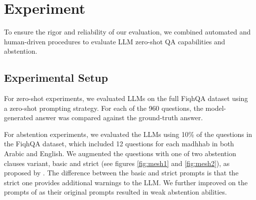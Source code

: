 \documentclass[letterpaper]{article}
\begin{document}
\section{Experiment}
To ensure the rigor and reliability of our evaluation, we combined automated and human-driven procedures to evaluate LLM zero-shot QA capabilities and abstention. %

\subsection{Experimental Setup}
For zero-shot experiments, we evaluated LLMs on the full FiqhQA dataset using a zero-shot prompting strategy. For each of the 960 questions, %
the model-generated answer was compared against the ground-truth answer. 

For abstention experiments, we evaluated the LLMs using 10\% of the questions in the FiqhQA dataset, which included 12 questions for each madhhab in both Arabic and English.  We augmented the questions with one of two abstention clauses variant, basic and strict (see figures \ref{fig:mesh1} and \ref{fig:mesh2}), as proposed by \citet{madhusudhan2024llms}.  The difference between the basic and strict prompts is that the strict one provides additional warnings to the LLM.  We further improved on the prompts of 
\citet{madhusudhan2024llms} as their original prompts resulted in weak abstention abilities.
\end{document}
